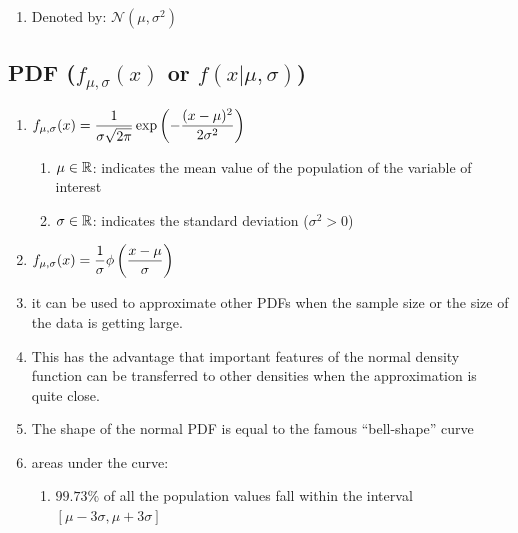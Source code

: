 \begin{enumerate}
    \item Denoted by: $\mathcal{N}(\mu, \sigma^2)$
\end{enumerate}


\subsection{PDF ($f_{\mu, \sigma}(x)$ or $f(x|\mu, \sigma)$)}

\begin{enumerate}
    \item  $
        f_{\mu, \sigma}(x)
        = \dfrac{1}{\sigma\sqrt{2\pi}} \exp\left(-\dfrac{(x-\mu)^2}{2\sigma^2}\right)
    $
    \hfill \cite{statistics/book/Statistics-for-Data-Scientists/Maurits-Kaptein}
    \begin{enumerate}
        \item[] $\mu \in \mathbb{R}$: indicates the mean value of the population of the variable of interest
        \hfill \cite{statistics/book/Statistics-for-Data-Scientists/Maurits-Kaptein}

        \item[] $\sigma \in \mathbb{R}$: indicates the standard deviation ($\sigma^2 > 0$)
        \hfill \cite{statistics/book/Statistics-for-Data-Scientists/Maurits-Kaptein}
    \end{enumerate}

    \item $f_{\mu, \sigma}(x) = \dfrac{1}{\sigma}\phi\left(\dfrac{x-\mu}{\sigma}\right)$
    \hfill \cite{statistics/book/Statistics-for-Data-Scientists/Maurits-Kaptein}


    \item it can be used to approximate other PDFs when the sample size or the size of the data is getting large.
    \hfill \cite{statistics/book/Statistics-for-Data-Scientists/Maurits-Kaptein}

    \item This has the advantage that important features of the normal density function can be transferred to other densities when the approximation is quite close.
    \hfill \cite{statistics/book/Statistics-for-Data-Scientists/Maurits-Kaptein}

    \item The shape of the normal PDF is equal to the famous “bell-shape” curve
    \hfill \cite{statistics/book/Statistics-for-Data-Scientists/Maurits-Kaptein}

    \item areas under the curve:
    \begin{enumerate}
        \item $99.73\%$ of all the population values fall within the interval $[\mu - 3\sigma, \mu + 3\sigma]$
        \hfill \cite{statistics/book/Statistics-for-Data-Scientists/Maurits-Kaptein}


\end{enumerate}
\end{enumerate}
